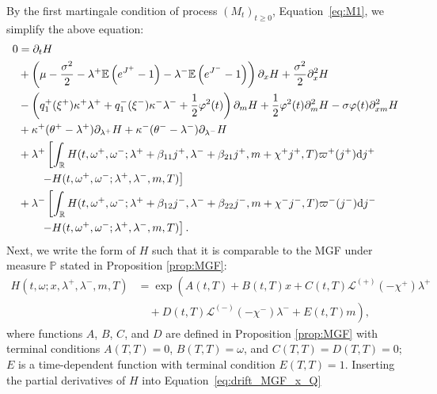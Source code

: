 \documentclass[11pt,a4paper]{article}
\numberwithin{equation}{section}
\theoremstyle{remark}
\theoremstyle{definition}
\newcommand{\E}{{\mathbb{E}}}
\newcommand{\dd}{{\rm d}}
\begin{document}
By the first martingale condition of process $(M_t)_{t\geq 0}$, Equation~\eqref{eq:M1}, we simplify the above equation:
\begin{align}
    0 &= \partial_t H \nonumber\\
    &+ \left(\mu-\frac{\sigma^2}{2}-\lambda^+\E\left(e^{J^+}-1\right)-\lambda^-\E\left(e^{J^-}-1\right)\right)\partial_x H+\frac{\sigma^2}{2}\partial^2_x H \nonumber\\
    &-\left(q^+_1(\xi^+)\kappa^+\lambda^++q^-_1(\xi^-)\kappa^-\lambda^-+\frac{1}{2}\varphi^2(t)\right)\partial_m H
     +\frac{1}{2}\varphi^2(t)\partial^2_m H %
     -\sigma\varphi(t)\partial^2_{xm}H\nonumber\\
    &+\kappa^+(\theta^+-\lambda^+)\partial_{\lambda^+} H
     +\kappa^-(\theta^--\lambda^-)\partial_{\lambda^-} H\nonumber\\
    &+\lambda^+ \left[\int_\mathbb{R}H(t, \omega^+, \omega^-; \lambda^++\beta_{11}j^+, \lambda^-+\beta_{21}j^+, m+\chi^+j^+, T)\varpi^+(j^+)\dd j^+\right.\nonumber\\
    &\qquad\left. - H(t, \omega^+, \omega^-; \lambda^+, \lambda^-, m, T)\right]\nonumber\\
    &+\lambda^- \left[\int_\mathbb{R}H(t, \omega^+, \omega^-; \lambda^++\beta_{12}j^-, \lambda^-+\beta_{22}j^-, m+\chi^-j^-, T)\varpi^-(j^-)\dd j^-\right.\nonumber\\
    &\qquad\left. - H(t, \omega^+, \omega^-; \lambda^+, \lambda^-, m, T)\right]. \label{eq:drift_MGF_x_Q}
\end{align}
Next, we write the form of $H$ such that it is comparable to the MGF under measure $\mathbb{P}$ stated in Proposition \ref{prop:MGF}:
\begin{align*}
    H(t, \omega; x, \lambda^+, \lambda^-, m, T) &= \exp\left(A(t,T)+B(t,T)x+C(t,T)\mathcal{L}^{(+)}(-\chi^+)\lambda^+\right.\\
    &\quad\left.{}+D(t,T)\mathcal{L}^{(-)}(-\chi^-)\lambda^-+E(t,T)m\right),
\end{align*}
where functions $A$, $B$, $C$, and $D$ are defined in Proposition \ref{prop:MGF} with terminal conditions $A(T,T)=0$, $B(T,T)=\omega$, and $C(T,T)=D(T,T)=0$; $E$ is a time-dependent function with terminal condition $E(T,T)=1$.
Inserting the partial derivatives of $H$ into Equation~\eqref{eq:drift_MGF_x_Q}
\end{document}
